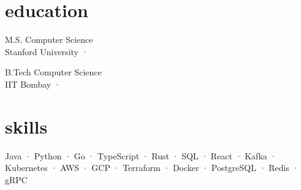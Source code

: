 \documentclass[10pt,letterpaper]{article}
\begin{document}
\section{education}

{\normalsize M.S. Computer Science} \\[1pt]
{\small\color{lightgray} Stanford University \enspace · }

\vspace{8pt}
{\normalsize B.Tech Computer Science} \\[1pt]
{\small\color{lightgray} IIT Bombay \enspace · }

\section{skills}

{\small
Java \enspace · \enspace Python \enspace · \enspace Go \enspace · \enspace TypeScript \enspace · \enspace Rust \enspace · \enspace SQL \enspace · \enspace React \enspace · \enspace Kafka \enspace · \enspace Kubernetes \enspace · \enspace AWS \enspace · \enspace GCP \enspace · \enspace Terraform \enspace · \enspace Docker \enspace · \enspace PostgreSQL \enspace · \enspace Redis \enspace · \enspace gRPC
}
\end{document}
